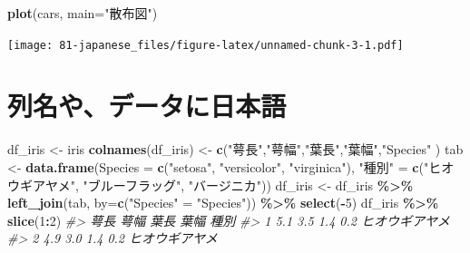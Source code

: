 \documentclass[
  xelatex, ja=standard]{bxjsbook}
\newenvironment{Shaded}{\begin{snugshade}}{\end{snugshade}}
\newcommand{\AttributeTok}[1]{\textcolor[rgb]{0.13,0.29,0.53}{#1}}
\newcommand{\CommentTok}[1]{\textcolor[rgb]{0.56,0.35,0.01}{\textit{#1}}}
\newcommand{\DecValTok}[1]{\textcolor[rgb]{0.00,0.00,0.81}{#1}}
\newcommand{\FunctionTok}[1]{\textcolor[rgb]{0.13,0.29,0.53}{\textbf{#1}}}
\newcommand{\NormalTok}[1]{#1}
\newcommand{\OtherTok}[1]{\textcolor[rgb]{0.56,0.35,0.01}{#1}}
\newcommand{\SpecialCharTok}[1]{\textcolor[rgb]{0.81,0.36,0.00}{\textbf{#1}}}
\newcommand{\StringTok}[1]{\textcolor[rgb]{0.31,0.60,0.02}{#1}}
\theoremstyle{definition}
\theoremstyle{definition}
\theoremstyle{definition}
\theoremstyle{definition}
\theoremstyle{remark}
\begin{document}
\begin{Shaded}
\begin{Highlighting}[]
\FunctionTok{plot}\NormalTok{(cars, }\AttributeTok{main=}\StringTok{"散布図"}\NormalTok{)}
\end{Highlighting}
\end{Shaded}

\texttt{[image: 81-japanese\_files/figure-latex/unnamed-chunk-3-1.pdf]}

\hypertarget{ux5217ux540dux3084ux30c7ux30fcux30bfux306bux65e5ux672cux8a9e}{%
\section{列名や、データに日本語}\label{ux5217ux540dux3084ux30c7ux30fcux30bfux306bux65e5ux672cux8a9e}}

\begin{Shaded}
\begin{Highlighting}[]
\NormalTok{df\_iris }\OtherTok{\textless{}{-}}\NormalTok{ iris}
\FunctionTok{colnames}\NormalTok{(df\_iris) }\OtherTok{\textless{}{-}} \FunctionTok{c}\NormalTok{(}\StringTok{"萼長"}\NormalTok{,}\StringTok{"萼幅"}\NormalTok{,}\StringTok{"葉長"}\NormalTok{,}\StringTok{"葉幅"}\NormalTok{,}\StringTok{"Species"}\NormalTok{ )}
\NormalTok{tab }\OtherTok{\textless{}{-}} \FunctionTok{data.frame}\NormalTok{(}\AttributeTok{Species =} \FunctionTok{c}\NormalTok{(}\StringTok{"setosa"}\NormalTok{, }\StringTok{"versicolor"}\NormalTok{, }\StringTok{"virginica"}\NormalTok{), }
                  \StringTok{"種別"} \OtherTok{=} \FunctionTok{c}\NormalTok{(}\StringTok{"ヒオウギアヤメ"}\NormalTok{, }\StringTok{"ブルーフラッグ"}\NormalTok{, }\StringTok{"バージニカ"}\NormalTok{))}
\NormalTok{df\_iris }\OtherTok{\textless{}{-}}\NormalTok{ df\_iris }\SpecialCharTok{\%\textgreater{}\%} \FunctionTok{left\_join}\NormalTok{(tab, }\AttributeTok{by=}\FunctionTok{c}\NormalTok{(}\StringTok{"Species"} \OtherTok{=} \StringTok{"Species"}\NormalTok{)) }\SpecialCharTok{\%\textgreater{}\%} \FunctionTok{select}\NormalTok{(}\SpecialCharTok{{-}}\DecValTok{5}\NormalTok{)}
\NormalTok{df\_iris }\SpecialCharTok{\%\textgreater{}\%} \FunctionTok{slice}\NormalTok{(}\DecValTok{1}\SpecialCharTok{:}\DecValTok{2}\NormalTok{)}
\CommentTok{\#\textgreater{}   萼長 萼幅 葉長 葉幅           種別}
\CommentTok{\#\textgreater{} 1  5.1  3.5  1.4  0.2 ヒオウギアヤメ}
\CommentTok{\#\textgreater{} 2  4.9  3.0  1.4  0.2 ヒオウギアヤメ}
\end{Highlighting}
\end{Shaded}
\end{document}
